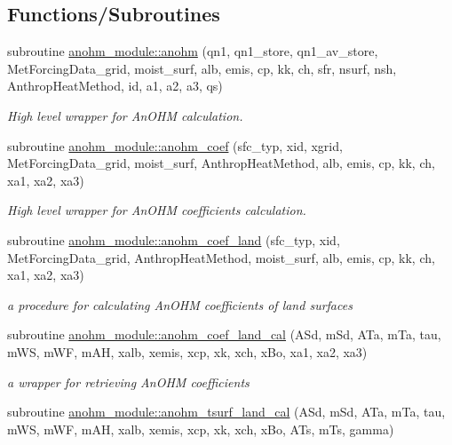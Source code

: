 \subsection*{Functions/\+Subroutines}
\begin{DoxyCompactItemize}
\item 
subroutine \hyperlink{namespaceanohm__module_a12150b343f1a4a8c3210e499cb9db9d9}{anohm\+\_\+module\+::anohm} (qn1, qn1\+\_\+store, qn1\+\_\+av\+\_\+store, Met\+Forcing\+Data\+\_\+grid, moist\+\_\+surf, alb, emis, cp, kk, ch, sfr, nsurf, nsh, Anthrop\+Heat\+Method, id, a1, a2, a3, qs)
\begin{DoxyCompactList}\small\item\em High level wrapper for An\+O\+HM calculation. \end{DoxyCompactList}\item 
subroutine \hyperlink{namespaceanohm__module_a5aa773c6b5c4a66155eaeb1c86c70471}{anohm\+\_\+module\+::anohm\+\_\+coef} (sfc\+\_\+typ, xid, xgrid, Met\+Forcing\+Data\+\_\+grid, moist\+\_\+surf, Anthrop\+Heat\+Method, alb, emis, cp, kk, ch, xa1, xa2, xa3)
\begin{DoxyCompactList}\small\item\em High level wrapper for An\+O\+HM coefficients calculation. \end{DoxyCompactList}\item 
subroutine \hyperlink{namespaceanohm__module_abe3a233f6e7d95775554ccc25e1cac45}{anohm\+\_\+module\+::anohm\+\_\+coef\+\_\+land} (sfc\+\_\+typ, xid, Met\+Forcing\+Data\+\_\+grid, Anthrop\+Heat\+Method, moist\+\_\+surf, alb, emis, cp, kk, ch, xa1, xa2, xa3)
\begin{DoxyCompactList}\small\item\em a procedure for calculating An\+O\+HM coefficients of land surfaces \end{DoxyCompactList}\item 
subroutine \hyperlink{namespaceanohm__module_a20235f7bc1aada21135014d0e942e59f}{anohm\+\_\+module\+::anohm\+\_\+coef\+\_\+land\+\_\+cal} (A\+Sd, m\+Sd, A\+Ta, m\+Ta, tau, m\+WS, m\+WF, m\+AH, xalb, xemis, xcp, xk, xch, x\+Bo, xa1, xa2, xa3)
\begin{DoxyCompactList}\small\item\em a wrapper for retrieving An\+O\+HM coefficients \end{DoxyCompactList}\item 
subroutine \hyperlink{namespaceanohm__module_a3f1a576bdde691f251c98f56d28b6c5e}{anohm\+\_\+module\+::anohm\+\_\+tsurf\+\_\+land\+\_\+cal} (A\+Sd, m\+Sd, A\+Ta, m\+Ta, tau, m\+WS, m\+WF, m\+AH, xalb, xemis, xcp, xk, xch, x\+Bo, A\+Ts, m\+Ts, gamma)

\end{DoxyCompactItemize}
